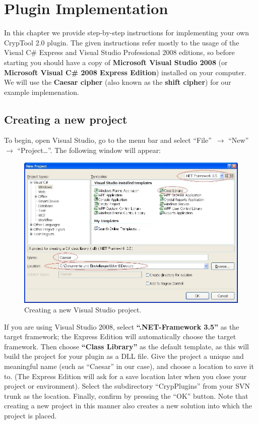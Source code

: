 \chapter{Plugin Implementation}
\label{sec:PluginImplementation}
In this chapter we provide step-by-step instructions for implementing your own CrypTool 2.0 plugin. The given instructions refer mostly to the usage of the Visual C\# Express and Visual Studio Professional 2008 editions, so before starting you should have a copy of \textbf{Microsoft Visual Studio 2008} (or \textbf{Microsoft Visual C\# 2008 Express Edition}) installed on your computer. We will use the \textbf{Caesar cipher} (also known as the \textbf{shift cipher}) for our example implemenation.

\section{Creating a new project}
\label{sec:CreatingANewProject}

To begin, open Visual Studio, go to the menu bar and select ``File''~$\rightarrow$ ``New'' $\rightarrow$ ``Project\ldots ''. The following window will appear:

\begin{figure}[h!]
	\centering
		\includegraphics[width=1.00\textwidth]{figures/vs_create_new_project.jpg}
	\caption{Creating a new Visual Studio project.}
	\label{fig:vs_create_new_project}
\end{figure}

\noindent If you are using Visual Studio 2008, select \textbf{``.NET-Framework 3.5''} as the target framework; the Express Edition will automatically choose the target framework. Then choose \textbf{``Class Library''} as the default template, as this will build the project for your plugin as a DLL file. Give the project a unique and meaningful name (such as ``Caesar'' in our case), and choose a location to save it to. (The Express Edition will ask for a save location later when you close your project or environment). Select the subdirectory ``CrypPlugins'' from your SVN trunk as the location. Finally, confirm by pressing the ``OK'' button. Note that creating a new project in this manner also creates a new solution into which the project is placed.


